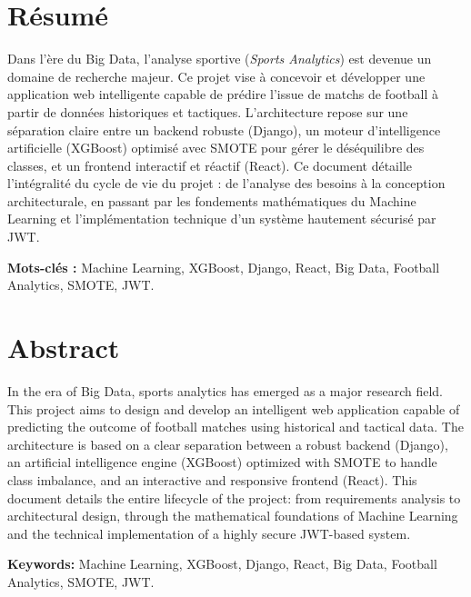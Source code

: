 \chapter*{Résumé}
Dans l'ère du Big Data, l'analyse sportive (\textit{Sports Analytics}) est devenue un domaine de recherche majeur. Ce projet vise à concevoir et développer une application web intelligente capable de prédire l'issue de matchs de football à partir de données historiques et tactiques. L'architecture repose sur une séparation claire entre un backend robuste (Django), un moteur d'intelligence artificielle (XGBoost) optimisé avec SMOTE pour gérer le déséquilibre des classes, et un frontend interactif et réactif (React). Ce document détaille l'intégralité du cycle de vie du projet : de l'analyse des besoins à la conception architecturale, en passant par les fondements mathématiques du Machine Learning et l'implémentation technique d'un système hautement sécurisé par JWT.

\vspace{1cm}
\noindent\textbf{Mots-clés :} Machine Learning, XGBoost, Django, React, Big Data, Football Analytics, SMOTE, JWT.

\chapter*{Abstract}
In the era of Big Data, sports analytics has emerged as a major research field. This project aims to design and develop an intelligent web application capable of predicting the outcome of football matches using historical and tactical data. The architecture is based on a clear separation between a robust backend (Django), an artificial intelligence engine (XGBoost) optimized with SMOTE to handle class imbalance, and an interactive and responsive frontend (React). This document details the entire lifecycle of the project: from requirements analysis to architectural design, through the mathematical foundations of Machine Learning and the technical implementation of a highly secure JWT-based system.

\vspace{1cm}
\noindent\textbf{Keywords:} Machine Learning, XGBoost, Django, React, Big Data, Football Analytics, SMOTE, JWT.
